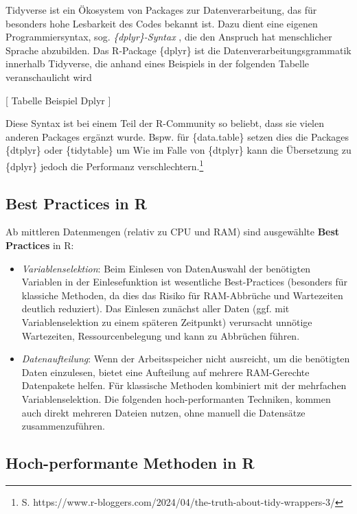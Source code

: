 \documentclass[
  german,
  10pt,
  twoside]{article}
\providecommand{\tightlist}{%
  \setlength{\itemsep}{0pt}\setlength{\parskip}{0pt}}
\begin{document}
Tidyverse \autocite{R-tidyverse} ist ein Ökosystem von Packages zur
Datenverarbeitung, das für besonders hohe Lesbarkeit des Codes bekannt
ist. Dazu dient eine eigenen Programmiersyntax, sog.
\emph{\{dplyr\}-Syntax} \autocite{R-dplyr}, die den Anspruch hat
menschlicher Sprache abzubilden. Das R-Package \{dplyr\} ist die
Datenverarbeitungsgrammatik innerhalb Tidyverse, die anhand eines
Beispiels in der folgenden Tabelle veranschaulicht wird

{[} Tabelle Beispiel Dplyr {]}

Diese Syntax ist bei einem Teil der R-Community so beliebt, dass sie
vielen anderen Packages ergänzt wurde. Bspw. für \{data.table\} setzen
dies die Packages \{dtplyr\} \autocite{R-dtplyr} oder \{tidytable\}
\autocite{R-tidytable} um Wie im Falle von \{dtplyr\} kann die
Übersetzung zu \{dplyr\} jedoch die Performanz
verschlechtern.\footnote{S.
  https://www.r-bloggers.com/2024/04/the-truth-about-tidy-wrappers-3/}

\subsection{Best Practices in R}\label{best-practices-in-r}

Ab mittleren Datenmengen (relativ zu CPU und RAM) sind ausgewählte
\textbf{Best Practices} in R:

\begin{itemize}
\tightlist
\item
  \emph{Variablenselektion}: Beim Einlesen von DatenAuswahl der
  benötigten Variablen in der Einlesefunktion ist wesentliche
  Best-Practices (besonders für klassiche Methoden, da dies das Risiko
  für RAM-Abbrüche und Wartezeiten deutlich reduziert). Das Einlesen
  zunächst aller Daten (ggf. mit Variablenselektion zu einem späteren
  Zeitpunkt) verursacht unnötige Wartezeiten, Ressourcenbelegung und
  kann zu Abbrüchen führen.
\item
  \emph{Datenaufteilung}: Wenn der Arbeitsspeicher nicht ausreicht, um
  die benötigten Daten einzulesen, bietet eine Aufteilung auf mehrere
  RAM-Gerechte Datenpakete helfen. Für klassische Methoden kombiniert
  mit der mehrfachen Variablenselektion. Die folgenden hoch-performanten
  Techniken, kommen auch direkt mehreren Dateien nutzen, ohne manuell
  die Datensätze zusammenzuführen.
\end{itemize}

\subsection{Hoch-performante Methoden in R}\label{sec-highperf}
\end{document}
